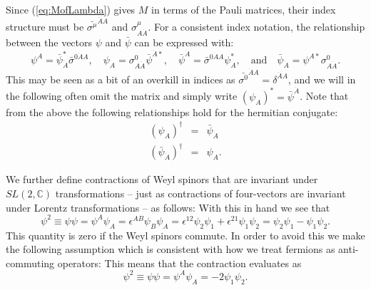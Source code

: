 \documentclass[notes.tex]{subfiles}
\begin{document}
Since (\ref{eq:MofLambda}) gives $M$ in terms of the Pauli matrices, their index structure must be $\bar{\sigma^\mu}^{\dot{A}A}$ and $\sigma^\mu_{A\dot{A}}$. 
For a consistent index notation, the relationship between the vectors $\psi$ and $\bar{\psi}$ can be expressed with:
\[  \psi^A = \bar\psi_{\dot{A}}^*\bar{\sigma}^{0\dot{A}A}, \quad  \psi_A = {\sigma}^0_{A\dot{A}}\bar\psi^{\dot{A}*}, \quad  \bar{\psi}^{\dot{A}} = \bar{\sigma}^{0\dot{A}A}\psi_A^*, \quad \text{and}\quad  \bar{\psi}_{\dot{A}} =\psi^{A*} \sigma^0_{A\dot{A}} .\]
This may be seen as a bit of an overkill in indices as $\bar{\sigma^0}^{\dot{A}A} = \delta^{\dot{A}A}$, and we will in the following often omit the matrix and simply write $(\psi_A)^* = \bar{\psi}^{\dot{A}}$.
Note that from the above the following relationships hold for the hermitian conjugate:
\begin{eqnarray}
(\psi_A)^\dagger &=& \bar{\psi}_{\dot{A}} \\
(\bar{\psi}_{\dot{A}})^\dagger &=& \psi_A. \label{eq:Weyl_hc}
\end{eqnarray}

We further define contractions of Weyl spinors that are invariant under $SL(2,\mathbb{C})$ transformations -- just as  contractions of four-vectors are invariant under Lorentz transformations -- as follows:
With this in hand we see that 
\[\psi^2 \equiv \psi \psi = \psi^A\psi_A = \epsilon^{AB}\psi_B\psi_A = \epsilon^{12}\psi_2\psi_1 + \epsilon^{21}\psi_1\psi_2 = \psi_2\psi_1 - \psi_1\psi_2.\]
This quantity is zero if the Weyl spinors commute. In order to avoid this we make the following assumption which is consistent with how we treat fermions as anti-commuting operators:
This means that the contraction evaluates as
\[\psi^2 \equiv \psi \psi = \psi^A\psi_A = -2 \psi_1\psi_2.\]


\end{document}
